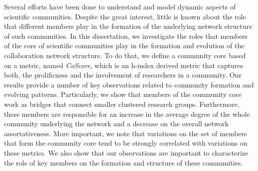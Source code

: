 Several efforts have been done to understand and model dynamic aspects of 
scientific communities. Despite the great interest, little is known about the role that different members play 
in the formation of the underlying network structure of such communities. In this dissertation, we  
investigate the roles that members of the core of scientific communities play in the formation and 
evolution of the collaboration network structure. To do that, we define a community core based on a metric, 
named \textit{CoScore}, which is an h-index derived metric that captures both, the prolificness and the involvement
of researchers in a community. Our results provide a number of key observations related to community formation and 
evolving patterns. Particularly, we show that members of the community core work as bridges that connect smaller 
clustered research groups. Furthermore, these members are responsible for an increase in 
the average degree of the whole community underlying the network and a decrease on the overall network assortativeness. 
More important, we note that variations on the set of members that form the community core tend to be strongly correlated with 
variations on these metrics. We also show that our observations are important to characterize the role of key 
members on the formation and structure of these communities.


